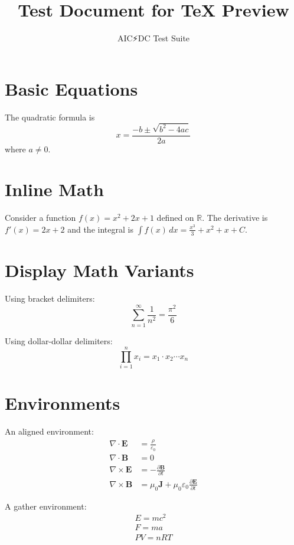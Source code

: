 \documentclass{article}
\title{Test Document for TeX Preview}
\author{AIC⚡DC Test Suite}
\date{}
\begin{document}
\maketitle

\section{Basic Equations}

The quadratic formula is
\begin{equation}
x = \frac{-b \pm \sqrt{b^2 - 4ac}}{2a}
\label{eq:quadratic}
\end{equation}
where $a \neq 0$.

\section{Inline Math}

Consider a function $f(x) = x^2 + 2x + 1$ defined on $\mathbb{R}$.
The derivative is $f'(x) = 2x + 2$ and the integral is
$\int f(x)\,dx = \frac{x^3}{3} + x^2 + x + C$.

\section{Display Math Variants}

Using bracket delimiters:
\[
\sum_{n=1}^{\infty} \frac{1}{n^2} = \frac{\pi^2}{6}
\]

Using dollar-dollar delimiters:
$$
\prod_{i=1}^{n} x_i = x_1 \cdot x_2 \cdots x_n
$$

\section{Environments}

An aligned environment:
\begin{align}
\nabla \cdot \mathbf{E} &= \frac{\rho}{\varepsilon_0} \\
\nabla \cdot \mathbf{B} &= 0 \\
\nabla \times \mathbf{E} &= -\frac{\partial \mathbf{B}}{\partial t} \\
\nabla \times \mathbf{B} &= \mu_0 \mathbf{J} + \mu_0 \varepsilon_0 \frac{\partial \mathbf{E}}{\partial t}
\end{align}

A gather environment:
\begin{gather}
E = mc^2 \\
F = ma \\
PV = nRT
\end{gather}
\end{document}
